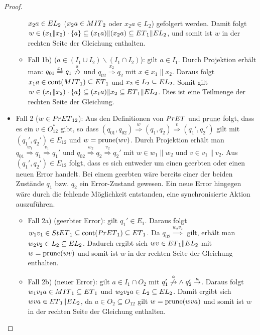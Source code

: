 \begin{proof}
\begin{itemize}
\begin{itemize}
      $x_2a\in EL{}_2$ ($x_2a\in MIT{}_2$ oder $x_2a\in L_2$)
      gefolgert werden. Damit folgt $w\in (x_1\|x_2)\cdot\{a\}\subseteq
      (x_1a)\|(x_2a)\subseteq ET{}_1\|EL{}_2$, und somit ist $w$ in der
      rechten Seite der Gleichung enthalten.
  \item Fall 1b) ($a\in (I_1\cup I_2)\backslash(I_1\cap I_2)$): \OBdA{} gilt
      $a\in I_1$. Durch Projektion erhält man:
      $q_{01}\overset{x_1}{\Rightarrow} q_1
      \overset{a}{\not{\hspace{-0.1cm}\rightarrow}}$ und
      $q_{02}\overset{x_2}{\Rightarrow} q_2$ mit $x\in x_1\|x_2$. Daraus folgt
      $x_1a\in \mathrm{cont}{}(MIT{}_1)\subseteq ET{}_1$ und $x_2\in L_2\subseteq EL{}_2$. Somit
      gilt $w\in (x_1\| x_2)\cdot\{a\}\subseteq (x_1a)\|x_2\subseteq ET{}_1\|EL{}_2$.
      Dies ist eine Teilmenge der rechten Seite der Gleichung.
  \end{itemize}
    \item Fall 2 ($w\in PrET{}_{12}$): Aus den Definitionen von $PrET{}$
      und $\mathrm{prune}{}$ folgt, dass es ein $v\in O_{12}^*$ gibt, so dass
      $(q_{01},q_{02}) \overset{w}{\Rightarrow} (q_1,q_2)
      \overset{v}{\Rightarrow} (q_1',q_2')$ gilt mit $(q_1',q_2')\in E_{12}$
      und $w=\mathrm{prune}{}(wv)$. Durch Projektion erhält man $q_{01}
      \overset{w_1}{\Rightarrow} q_1 \overset{v_1}{\Rightarrow} q_1'$ und
      $q_{02} \overset{w_2}{\Rightarrow} q_2 \overset{v_2}{\Rightarrow} q_2'$
      mit $w\in w_1\|w_2$ und $v\in v_1\|v_2$. Aus $(q_1',q_2')\in E_{12}$
      folgt, dass es sich entweder um einen geerbten oder einen neuen Error
      handelt. Bei einem geerbten wäre bereits einer der beiden Zustände $q_1$
      bzw. $q_2$ ein Error-Zustand gewesen. Ein neue Error hingegen wäre durch
      die fehlende Möglichkeit entstanden, eine synchronisierte Aktion
      auszuführen.
      \begin{itemize}
        \item Fall 2a) (geerbter Error): \OBdA{} gilt $q_1'\in E_1$. Daraus folgt
          $w_1v_1\in StET{}_1\subseteq \mathrm{cont}{}(PrET{}_1)\subseteq ET{}_1$.
          Da $q_{02}\overset{w_2v_2}{\Longrightarrow}$ gilt, erhält man $w_2v_2\in
          L_2\subseteq EL{}_2$. Dadurch ergibt sich $wv\in ET{}_1\|EL{}_2$ mit
          $w=\mathrm{prune}{}(wv)$ und somit ist $w$ in der rechten Seite der Gleichung
          enthalten.
        \item Fall 2b) (neuer Error): \OBdA{} gilt $a\in I_1\cap O_2$ mit
          $q_1'\overset{a}{\not{\hspace{-0.1cm}\rightarrow}} \wedge \; q_2'
          \overset{a}{\rightarrow}$. Daraus folgt $w_1v_1a\in MIT{}_1\subseteq
          ET{}_1$ und $w_2v_2a\in L_2\subseteq EL{}_2$. Damit ergibt sich $wva\in
          ET{}_1\|EL{}_2$, da $a\in O_2\subseteq O_{12}$ gilt $w=\mathrm{prune}{}(wva)$ und
          somit ist $w$ in der rechten Seite der Gleichung enthalten.
      \end{itemize}
  \end{itemize}


\end{proof}
